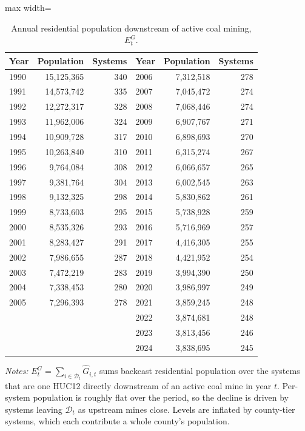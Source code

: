 \begin{table}[ht]
\centering
\caption{Annual residential population downstream of active coal mining, $E^{G}_t$.}
\label{tab:backcast_exposure_series}
\begin{adjustbox}{max width=\textwidth}
\begin{tabular}{lrr@{\hskip 2.5em}lrr}
\toprule
Year & Population & Systems & Year & Population & Systems \\
\midrule
1990 & 15,125,365 & 340 & 2006 & 7,312,518 & 278 \\
1991 & 14,573,742 & 335 & 2007 & 7,045,472 & 274 \\
1992 & 12,272,317 & 328 & 2008 & 7,068,446 & 274 \\
1993 & 11,962,006 & 324 & 2009 & 6,907,767 & 271 \\
1994 & 10,909,728 & 317 & 2010 & 6,898,693 & 270 \\
1995 & 10,263,840 & 310 & 2011 & 6,315,274 & 267 \\
1996 & 9,764,084 & 308 & 2012 & 6,066,657 & 265 \\
1997 & 9,381,764 & 304 & 2013 & 6,002,545 & 263 \\
1998 & 9,132,325 & 298 & 2014 & 5,830,862 & 261 \\
1999 & 8,733,603 & 295 & 2015 & 5,738,928 & 259 \\
2000 & 8,535,326 & 293 & 2016 & 5,716,969 & 257 \\
2001 & 8,283,427 & 291 & 2017 & 4,416,305 & 255 \\
2002 & 7,986,655 & 287 & 2018 & 4,421,952 & 254 \\
2003 & 7,472,219 & 283 & 2019 & 3,994,390 & 250 \\
2004 & 7,338,453 & 280 & 2020 & 3,986,997 & 249 \\
2005 & 7,296,393 & 278 & 2021 & 3,859,245 & 248 \\
 & &  & 2022 & 3,874,681 & 248 \\
 & &  & 2023 & 3,813,456 & 246 \\
 & &  & 2024 & 3,838,695 & 245 \\
\bottomrule
\end{tabular}
\end{adjustbox}
\begin{minipage}{\textwidth}\footnotesize
\vspace{0.5em}
\textit{Notes:} $E^{G}_t=\sum_{i\in\mathcal{D}_t}\hat{G}_{i,t}$ sums backcast residential population over the systems that are one HUC12 directly downstream of an active coal mine in year $t$. Per-system population is roughly flat over the period, so the decline is driven by systems leaving $\mathcal{D}_t$ as upstream mines close. Levels are inflated by county-tier systems, which each contribute a whole county's population.
\end{minipage}
\end{table}
